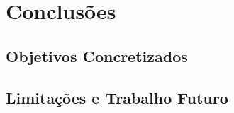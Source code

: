 \chapter{Conclusões}
\label{cap:conclusão}


\section{Objetivos Concretizados}
\label{sec:objetivos_concretizados}

%
%
%

\section{Limitações e Trabalho Futuro}
\label{sec:trabalho_futuro}

